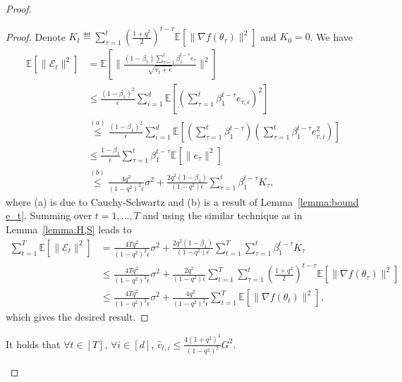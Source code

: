 \documentclass[11pt]{article}
\begin{document}
\begin{proof}
\begin{proof}
Denote $K_t\eqdef \sum_{\tau=1}^t (\frac{1+q^2}{2})^{t-\tau} \mathbb E[\|\nabla f(\theta_\tau)\|^2]$ and $K_0=0$. We have
\begin{align*}
    \mathbb E[\|\mathcal E_t\|^2]&=\mathbb E[\|\frac{(1-\beta_1)\sum_{\tau=1}^t\beta_1^{t-\tau} e_\tau}{\sqrt{\hat v_t+\epsilon}}\|^2]\\
    &\leq \frac{(1-\beta_1)^2}{\epsilon}\sum_{i=1}^d \mathbb E[(\sum_{\tau=1}^t\beta_1^{t-\tau} e_{\tau,i})^2]\\
    &\overset{(a)}{\leq} \frac{(1-\beta_1)^2}{\epsilon}\sum_{i=1}^d \mathbb E[(\sum_{\tau=1}^t\beta_1^{t-\tau})(\sum_{\tau=1}^t\beta_1^{t-\tau} e_{\tau,i}^2)]\\
    &\leq \frac{1-\beta_1}{\epsilon}\sum_{\tau=1}^t \beta_1^{t-\tau}\mathbb E[\|e_\tau\|^2]\\
    &\overset{(b)}{\leq} \frac{4q^2}{(1-q^2)^2\epsilon}\sigma^2+\frac{2q^2(1-\beta_1)}{(1-q^2)\epsilon}\sum_{\tau=1}^t \beta_1^{t-\tau} K_\tau,
\end{align*}
where (a) is due to Cauchy-Schwartz and (b) is a result of Lemma~\ref{lemma:bound e_t}. Summing over $t=1,...,T$ and using the similar technique as in Lemma~\ref{lemma:H,S} leads to
\begin{align*}
    \sum_{t=1}^T \mathbb E[\|\mathcal E_t\|^2]&=\frac{4Tq^2}{(1-q^2)^2\epsilon}\sigma^2 + \frac{2q^2(1-\beta_1)}{(1-q^2)\epsilon}\sum_{t=1}^T \sum_{\tau=1}^t \beta_1^{t-\tau} K_\tau\\
    &\leq \frac{4Tq^2}{(1-q^2)^2\epsilon}\sigma^2 +\frac{2q^2}{(1-q^2)\epsilon}\sum_{t=1}^T\sum_{\tau=1}^t (\frac{1+q^2}{2})^{t-\tau} \mathbb E[\|\nabla f(\theta_\tau)\|^2]\\
    &\leq \frac{4Tq^2}{(1-q^2)^2\epsilon}\sigma^2 + \frac{4q^2}{(1-q^2)^2\epsilon} \sum_{t=1}^T \mathbb E[\|\nabla f(\theta_t)\|^2],
\end{align*}
which gives the desired result.

\end{proof}

\begin{Lemma} \label{lemma:bound v_t}
It holds that $\forall t\in [T]$, $\forall i\in [d]$, $\hat v_{t,i}\leq \frac{4(1+q^2)^3}{(1-q^2)^2}G^2$.

\end{Lemma}


\end{proof}
\end{document}
